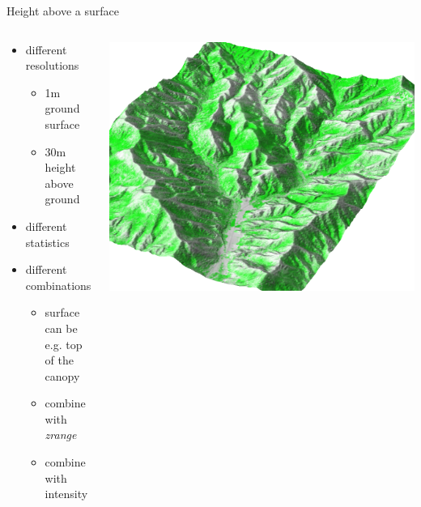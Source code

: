 \documentclass[xcolor={dvipsnames,usenames},beamer,aspectratio=169]{beamer}
\begin{document}
\begin{frame}{Height above a surface}

\begin{columns}
\begin{column}{0.4\textwidth}

\begin{itemize}
 \item different resolutions
  \begin{itemize}
    \item \rule{0pt}{0pt}\phantom{0}1m ground surface
    \item 30m height above ground
  \end{itemize}
  \item different statistics
  \item different combinations
  \begin{itemize}
    \item surface can be e.g. top of the canopy
    \item combine with \textit{zrange}
    \item combine with intensity
  \end{itemize}
\end{itemize}

\end{column}
\begin{column}{0.55\textwidth}

\begin{center}
  \includegraphics[width=\textwidth]{grass/max_height_10m_on_ground_from_neighbors_smaller_area_top}
\end{center}

\end{column}
\end{columns}

\end{frame}
\end{document}
